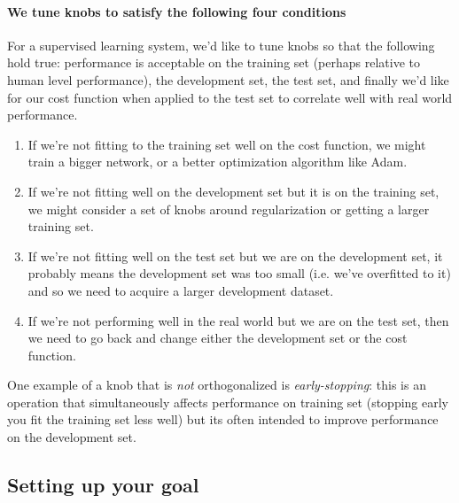 \documentclass[12pt]{article}
\begin{document}
\paragraph{We tune knobs to satisfy the following four conditions}
For a supervised learning system, we'd like to tune knobs so that the following hold true:
performance is acceptable on the training set (perhaps relative to human level performance), 
the development set, the test set, and finally we'd like for our cost
function when applied to the test set to correlate well with real world performance.
\begin{enumerate}   \item If we're not fitting to the training set well on the cost function, we might train a bigger network, or a better optimization algorithm like Adam.
  \item If we're not fitting well on the development set but it is on the training set, we might consider a set of knobs around regularization or getting a larger training set.
  \item If we're not fitting well on the test set but we are on the development set, it probably means the development set was too small (i.e. we've overfitted to it) and so we need to acquire a larger development dataset.
  \item If we're not performing well in the real world but we are on the test set, then we need to go back and change either the development set or the cost function. \end{enumerate}

One example of a knob that is \emph{not} orthogonalized is \emph{early-stopping}: this is an operation that simultaneously affects performance on training set (stopping early you fit the training set less well) but its often intended to improve performance on the development set.

\subsection{Setting up your goal}
\end{document}
